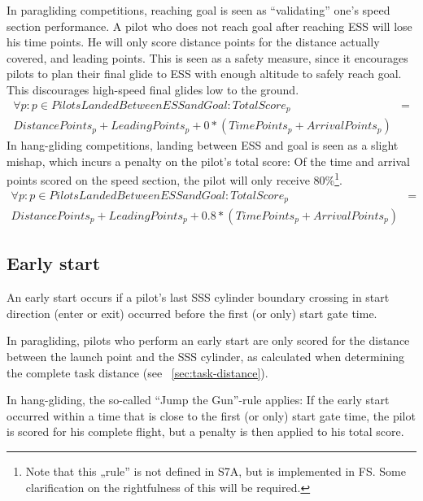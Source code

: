 \documentclass{article}
\begin{document}
In paragliding competitions, reaching goal is seen as “validating” one’s speed section performance. A
pilot who does not reach goal after reaching ESS will lose his time points. He will only score distance
points for the distance actually covered, and leading points. This is seen as a safety measure, since it
encourages pilots to plan their final glide to ESS with enough altitude to safely reach goal. This
discourages high-speed final glides low to the ground.
\begin{align*}
    \forall p : p \in PilotsLandedBetweenESSandGoal : TotalScore_p &= \\
    DistancePoints_p + LeadingPoints_p + 0 * (TimePoints_p + ArrivalPoints_p)
\end{align*}
In hang-gliding competitions, landing between ESS and goal is seen as a slight mishap, which incurs a
penalty on the pilot’s total score: Of the time and arrival points scored on the speed section, the pilot
will only receive 80\%\footnote{Note that this „rule” is not defined in S7A, but is implemented in FS. Some clarification on the rightfulness of this
will be required.}.
\begin{align*}
    \forall p : p \in PilotsLandedBetweenESSandGoal : TotalScore_p &= \\
    DistancePoints_p + LeadingPoints_p + 0.8 * (TimePoints_p + ArrivalPoints_p)
\end{align*}

\subsection{Early start}
An early start occurs if a pilot’s last SSS cylinder boundary crossing in start direction (enter or exit)
occurred before the first (or only) start gate time.

In paragliding, pilots who perform an early start are only scored for the distance between the launch
point and the SSS cylinder, as calculated when determining the complete task distance (see ~\ref{sec:task-distance}).

In hang-gliding, the so-called “Jump the Gun”-rule applies: If the early start occurred within a time that
is close to the first (or only) start gate time, the pilot is scored for his complete flight, but a penalty is
then applied to his total score.
\end{document}

